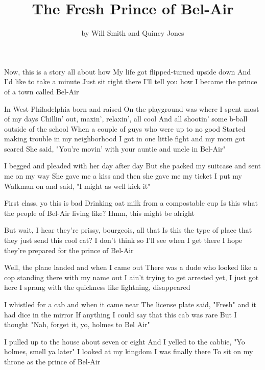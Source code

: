 \documentclass{article}
\title{The Fresh Prince of Bel-Air}
\author{by Will Smith and Quincy Jones}
\begin{document}
\maketitle

Now, this is a story all about how
My life got flipped-turned upside down
And I'd like to take a minute
Just sit right there
I'll tell you how I became the prince of a town called Bel-Air

In West Philadelphia born and raised
On the playground was where I spent most of my days
Chillin' out, maxin', relaxin', all cool
And all shootin' some b-ball outside of the school
When a couple of guys who were up to no good
Started making trouble in my neighborhood
I got in one little fight and my mom got scared
She said, "You're movin' with your auntie and uncle in Bel-Air"

I begged and pleaded with her day after day
But she packed my suitcase and sent me on my way
She gave me a kiss and then she gave me my ticket
I put my Walkman on and said, "I might as well kick it"

First class, yo this is bad
Drinking oat milk from a compostable cup
Is this what the people of Bel-Air living like?
Hmm, this might be alright

But wait, I hear they're prissy, bourgeois, all that
Is this the type of place that they just send this cool cat?
I don't think so
I'll see when I get there
I hope they're prepared for the prince of Bel-Air

Well, the plane landed and when I came out
There was a dude who looked like a cop standing there with my name out
I ain't trying to get arrested yet, I just got here
I sprang with the quickness like lightning, disappeared

I whistled for a cab and when it came near
The license plate said, "Fresh" and it had dice in the mirror
If anything I could say that this cab was rare
But I thought "Nah, forget it, yo, holmes to Bel Air"

I pulled up to the house about seven or eight
And I yelled to the cabbie, "Yo holmes, smell ya later"
I looked at my kingdom
I was finally there
To sit on my throne as the prince of Bel-Air
\end{document}
